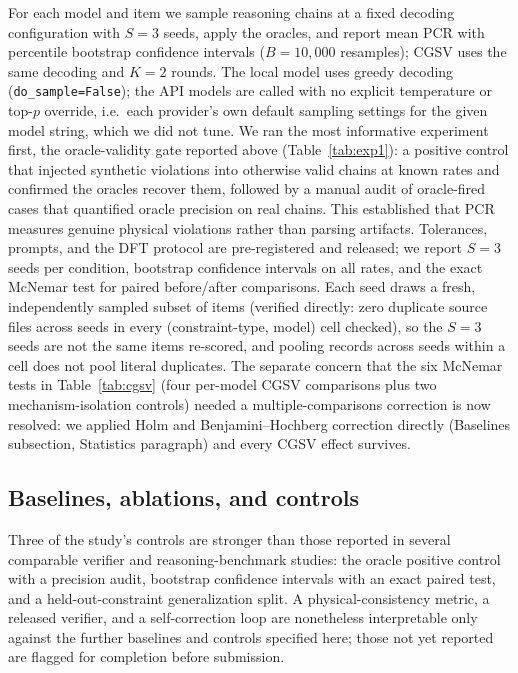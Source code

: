 \documentclass[pdflatex,sn-nature]{sn-jnl}
\begin{document}
For each model and item we sample reasoning chains at a fixed decoding configuration
with $S=3$ seeds, apply the oracles, and report mean PCR with percentile bootstrap
confidence intervals ($B=10{,}000$ resamples); CGSV uses the same decoding and $K=2$
rounds. The local model uses greedy decoding (\texttt{do\_sample=False}); the API models
are called with no explicit temperature or top-$p$ override, i.e.\ each provider's own
default sampling settings for the given model string, which we did not tune. We ran the most informative experiment first, the
oracle-validity gate reported above (Table~\ref{tab:exp1}): a positive control that
injected synthetic violations into otherwise valid chains at known rates and confirmed
the oracles recover them, followed by a manual audit of oracle-fired cases that
quantified oracle precision on real chains. This established that PCR measures genuine
physical violations rather than parsing artifacts. Tolerances, prompts, and the DFT
protocol are pre-registered and released; we report $S=3$ seeds per condition, bootstrap
confidence intervals on all rates, and the exact McNemar test for paired before/after
comparisons. Each seed draws a fresh, independently sampled subset of items (verified
directly: zero duplicate source files across seeds in every (constraint-type, model) cell
checked), so the $S=3$ seeds are not the same items re-scored, and pooling records across
seeds within a cell does not pool literal duplicates. The separate concern that the six
McNemar tests in Table~\ref{tab:cgsv} (four per-model CGSV comparisons plus two
mechanism-isolation controls) needed a multiple-comparisons correction is now resolved: we
applied Holm and Benjamini--Hochberg correction directly (Baselines subsection, Statistics
paragraph) and every CGSV effect survives.

\subsection*{Baselines, ablations, and controls}
Three of the study's controls are stronger than those reported in several comparable
verifier and reasoning-benchmark studies: the oracle positive control with a precision
audit, bootstrap confidence intervals with an exact paired test, and a held-out-constraint
generalization split.
A physical-consistency metric, a released verifier, and a self-correction loop are
nonetheless interpretable only against the further baselines and controls specified here;
those not yet reported are flagged for completion before submission.
\end{document}
